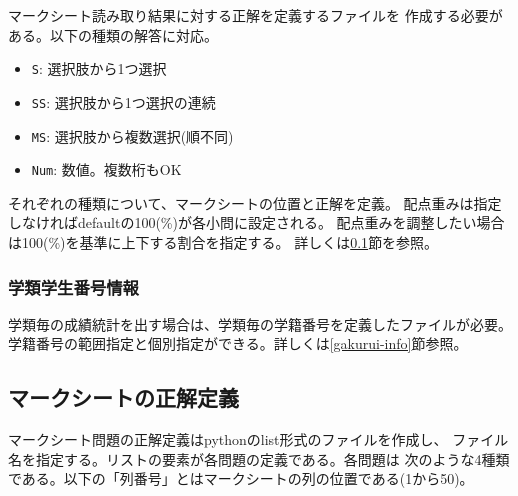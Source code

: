 マークシート読み取り結果に対する正解を定義するファイルを
作成する必要がある。以下の種類の解答に対応。

\begin{itemize}
\item \texttt{S}: 選択肢から1つ選択

\item \texttt{SS}: 選択肢から1つ選択の連続

\item \texttt{MS}: 選択肢から複数選択(順不同)

\item \texttt{Num}: 数値。複数桁もOK

\end{itemize}
それぞれの種類について、マークシートの位置と正解を定義。
配点重みは指定しなければdefaultの100(\%)が各小問に設定される。
配点重みを調整したい場合は100(\%)を基準に上下する割合を指定する。
詳しくは\ref{mksheet-ref}節を参照。

\subsubsection{学類学生番号情報}
\label{学類学生番号情報}

学類毎の成績統計を出す場合は、学類毎の学籍番号を定義したファイルが必要。
学籍番号の範囲指定と個別指定ができる。詳しくは\ref{gakurui-info}節参照。

\subsection{マークシートの正解定義}
\label{mksheet-ref}

マークシート問題の正解定義はpythonのlist形式のファイルを作成し、
ファイル名を指定する。リストの要素が各問題の定義である。各問題は
次のような4種類である。以下の「列番号」とはマークシートの列の位置である(1から50)。

